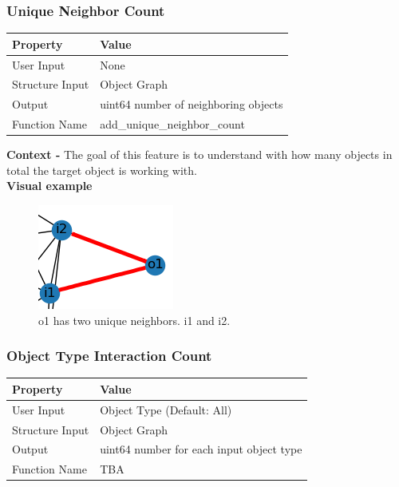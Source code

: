 \documentclass{article}
\begin{document}
\subsubsection{Unique Neighbor Count}
\begin{center}
	\begin{tabular}{| p{3cm} p{7cm} |}
		\hline
		\textbf{Property} & \textbf{Value}\\
		\hline
		User Input & None\\
		Structure Input & Object Graph\\
		Output & uint64 number of neighboring objects\\
		Function Name & add\_unique\_neighbor\_count\\
		\hline
	\end{tabular}
\end{center}

\textbf{Context -} The goal of this feature is to understand with how many objects in total the target object is working with.
\\

\textbf{Visual example}
\begin{figure}[h]
	\centering
	\includegraphics[scale=0.5]{images/obj-unc.png}
	\caption{o1 has two unique neighbors. i1 and i2.}
	\label{fig:obj-unc}
\end{figure}

\subsubsection{Object Type Interaction Count}
\begin{center}
	\begin{tabular}{| p{3cm} p{7cm} |}
		\hline
		\textbf{Property} & \textbf{Value}\\
		\hline
		User Input & Object Type (Default: All)\\
		Structure Input & Object Graph\\
		Output & uint64 number for each input object type\\
		Function Name & TBA\\
		\hline
	\end{tabular}
\end{center}
\end{document}
